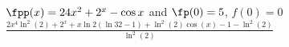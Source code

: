 {$\fpp(x) = 24x^2+2^x-\cos x$ and $\fp(0)= 5$, $f(0) = 0$
}
{$\frac{2 x^4 \ln ^2(2)+2^x+x \ln 2(\ln 32-1)+\ln^2(2) \cos (x)-1-\ln ^2(2)}{\ln ^2(2)}$
}

